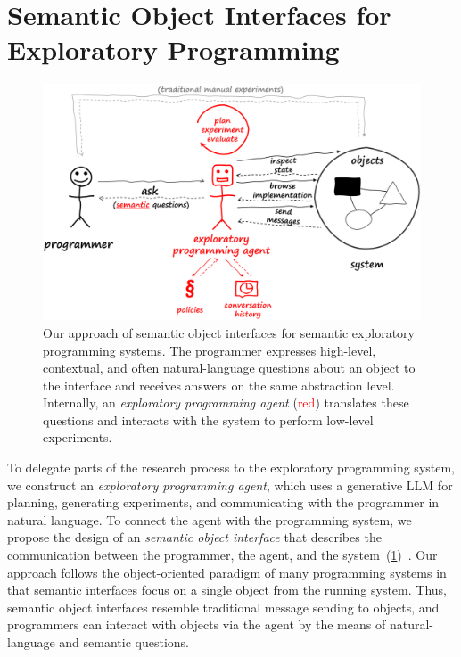
\section{Semantic Object Interfaces for Exploratory Programming}
\label{sec:design/agent}

\begin{figure}
	\centering
	\includegraphics[width=.9\textwidth]{03_agent/framework.png}
	\caption[Our approach of semantic object interfaces for semantic exploratory programming systems.]{
		Our approach of semantic object interfaces for semantic exploratory programming systems.
		The programmer expresses high-level, contextual, and often natural-language questions about an object to the interface and receives answers on the same abstraction level.
		Internally, an \emph{exploratory programming agent} (\textcolor{red}{red}) translates these questions and interacts with the system to perform low-level experiments.
	}
	\label{fig:design/agent/framework}
\end{figure}

To delegate parts of the research process to the exploratory programming system, we construct an \emph{exploratory programming agent}, which uses a generative LLM for planning, generating experiments, and communicating with the programmer in natural language.
To connect the agent with the programming system, we propose the design of an \emph{semantic object interface} that describes the communication between the programmer, the agent, and the system~(\cref{fig:design/agent/framework})~\cite{thiede2024talking}.
Our approach follows the object-oriented paradigm of many programming systems in that semantic interfaces focus on a single object from the running system.
Thus, semantic object interfaces resemble traditional message sending to objects, and programmers can interact with objects via the agent by the means of natural-language and semantic questions.

